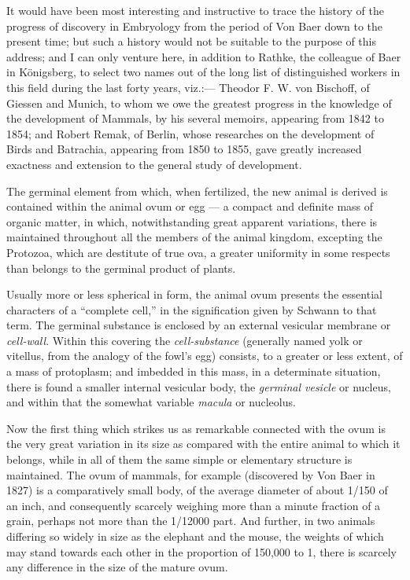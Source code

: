 \documentclass[a4paper, 11pt, oneside, english]{article}
\begin{document}
It would have been most interesting and instructive to trace the history of the progress of discovery in Embryology from the period of Von Baer down to the present time; but such a history would not be suitable to the purpose of this address; and I can only venture here, in addition to Rathke, the colleague of Baer in Königsberg, to select two names out of the long list of distinguished workers in this field during the last forty years, viz.:--- Theodor F. W. von Bischoff, of Giessen and Munich, to whom we owe the greatest progress in the knowledge of the development of Mammals, by his several memoirs, appearing from 1842 to 1854; and Robert Remak, of Berlin, whose researches on the development of Birds and Batrachia, appearing from 1850 to 1855, gave greatly increased exactness and extension to the general study of development.

The germinal element from which, when fertilized, the new animal is derived is contained within the animal ovum or egg --- a compact and definite mass of organic matter, in which, notwithstanding great apparent variations, there is maintained throughout all the members of the animal kingdom, excepting the Protozoa, which are destitute of true ova, a greater uniformity in some respects than belongs to the germinal product of plants.

Usually more or less spherical in form, the animal ovum presents the essential characters of a ``complete cell,'' in the signification given by Schwann to that term. The germinal substance is enclosed by an external vesicular membrane or \emph{cell-wall}. Within this covering the \emph{cell-substance} (generally named yolk or vitellus, from the analogy of the fowl's egg) consists, to a greater or less extent, of a mass of protoplasm; and imbedded in this mass, in a determinate situation, there is found a smaller internal vesicular body, the \emph{germinal vesicle} or nucleus, and within that the somewhat variable \emph{macula} or nucleolus.

Now the first thing which strikes us as remarkable connected with the ovum is the very great variation in its size as compared with the entire animal to which it belongs, while in all of them the same simple or elementary structure is maintained. The ovum of mammals, for example (discovered by Von Baer in 1827) is a comparatively small body, of the average diameter of about 1/150 of an inch, and consequently scarcely weighing more than a minute fraction of a grain, perhaps not more than the 1/12000 part. And further, in two animals differing so widely in size as the elephant and the mouse, the weights of which may stand towards each other in the proportion of 150,000 to 1, there is scarcely any difference in the size of the mature ovum.
\end{document}
